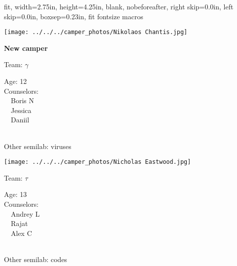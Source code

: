 \documentclass[10pt,letterpaper, landscape]{article}
\begin{document}
{
  fit,
  width=2.75in,
  height=4.25in,
  blank,
  nobeforeafter,
  right skip=0.0in,
  left skip=0.0in,
  boxsep=0.23in,
  fit fontsize macros
}\renewcommand{\baselinestretch}{1} \begin{sticker}
\noindent\begin{minipage}{0.5\textwidth}\texttt{[image: ../../../camper\_photos/Nikolaos Chantis.jpg]}\end{minipage}\begin{minipage}{0.45\textwidth}
\textbf{New camper} 

Team: {\Large $\gamma$}

Age:        12\\
Counselors: \\\ \ Boris N\\\ \ Jessica\\\ \ Daniil\\
\end{minipage} \\ \vspace{0.07in}
Other semilab: viruses
\end{sticker}
\horizontalshiftfornextsticker
\renewcommand{\baselinestretch}{1} \begin{sticker}
\noindent\begin{minipage}{0.5\textwidth}\texttt{[image: ../../../camper\_photos/Nicholas Eastwood.jpg]}\end{minipage}\begin{minipage}{0.45\textwidth}
Team: {\Large $\tau$}

Age:        13\\
Counselors: \\\ \ Andrey L\\\ \ Rajat\\\ \ Alex C\\
\end{minipage} \\ \vspace{0.07in}
Other semilab: codes
\end{sticker}
\horizontalshiftfornextsticker
\end{document}
